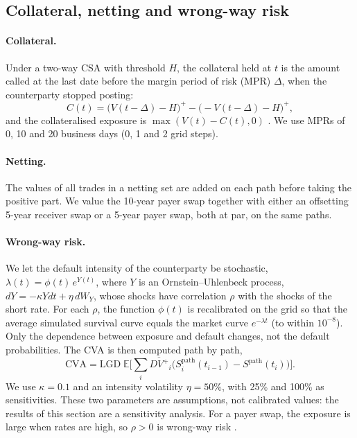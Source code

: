 \documentclass[11pt,a4paper]{article}
\begin{document}
\subsection{Collateral, netting and wrong-way risk}

\paragraph{Collateral.} Under a two-way CSA with threshold $H$, the collateral held at $t$ is the amount called at the last date before the margin period of risk (MPR) $\Delta$, when the counterparty stopped posting:
\begin{equation}
C(t) = \big(V(t-\Delta) - H\big)^+ - \big(-V(t-\Delta) - H\big)^+ ,
\end{equation}
and the collateralised exposure is $\max(V(t)-C(t),0)$ \citep{gregory2020}. We use MPRs of 0, 10 and 20 business days (0, 1 and 2 grid steps).

\paragraph{Netting.} The values of all trades in a netting set are added on each path before taking the positive part. We value the 10-year payer swap together with either an offsetting 5-year receiver swap or a 5-year payer swap, both at par, on the same paths.

\paragraph{Wrong-way risk.} We let the default intensity of the counterparty be stochastic, $\lambda(t) = \phi(t)\,e^{Y(t)}$, where $Y$ is an Ornstein--Uhlenbeck process, $dY = -\kappa Y dt + \eta\, dW_Y$, whose shocks have correlation $\rho$ with the shocks of the short rate. For each $\rho$, the function $\phi(t)$ is recalibrated on the grid so that the average simulated survival curve equals the market curve $e^{-\lambda t}$ (to within $10^{-8}$). Only the dependence between exposure and default changes, not the default probabilities. The CVA is then computed path by path,
\begin{equation}
\text{CVA} = \text{LGD}\;\mathbb{E}\Big[\sum_i \overline{D V^+}_i\big(S_i^{\text{path}}(t_{i-1}) - S^{\text{path}}(t_i)\big)\Big].
\end{equation}
We use $\kappa=0.1$ and an intensity volatility $\eta=50\%$, with 25\% and 100\% as sensitivities. These two parameters are assumptions, not calibrated values: the results of this section are a sensitivity analysis. For a payer swap, the exposure is large when rates are high, so $\rho>0$ is wrong-way risk \citep{hullwhite2012wwr}.
\end{document}
